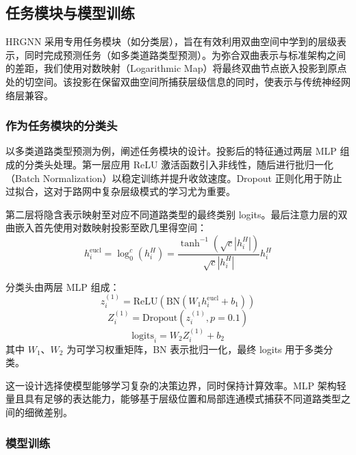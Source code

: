 \subsection{任务模块与模型训练}

HRGNN 采用专用任务模块（如分类层），旨在有效利用双曲空间中学到的层级表示，同时完成预测任务（如多类道路类型预测）。为弥合双曲表示与标准架构之间的差距，我们使用对数映射（Logarithmic Map）将最终双曲节点嵌入投影到原点处的切空间。该投影在保留双曲空间所捕获层级信息的同时，使表示与传统神经网络层兼容。

\subsubsection{作为任务模块的分类头}

以多类道路类型预测为例，阐述任务模块的设计。投影后的特征通过两层 MLP 组成的分类头处理。第一层应用 ReLU 激活函数引入非线性，随后进行批归一化（Batch Normalization）以稳定训练并提升收敛速度。Dropout 正则化用于防止过拟合，这对于路网中复杂层级模式的学习尤为重要。

第二层将隐含表示映射至对应不同道路类型的最终类别 logits。最后注意力层的双曲嵌入首先使用对数映射投影至欧几里得空间：
\begin{equation}
h_i^{\text{eucl}} = \log_0^c(h_i^H) = \frac{\tanh^{-1}(\sqrt{c}|h_i^H|)}{\sqrt{c}|h_i^H|}h_i^H
\label{eq:log_map}
\end{equation}

分类头由两层 MLP 组成：
\begin{equation}
z_i^{(1)} = \text{ReLU}(\text{BN}(W_1 h_i^{\text{eucl}} + b_1))
\label{eq:mlp_layer1}
\end{equation}
\begin{equation}
Z_i^{(1)} = \text{Dropout}(z_i^{(1)}, p=0.1)
\label{eq:dropout}
\end{equation}
\begin{equation}
\text{logits}_i = W_2 Z_i^{(1)} + b_2
\label{eq:mlp_layer2}
\end{equation}
其中 $W_1$、$W_2$ 为可学习权重矩阵，BN 表示批归一化，最终 logits 用于多类分类。

这一设计选择使模型能够学习复杂的决策边界，同时保持计算效率。MLP 架构轻量且具有足够的表达能力，能够基于层级位置和局部连通模式捕获不同道路类型之间的细微差别。

\subsubsection{模型训练}

